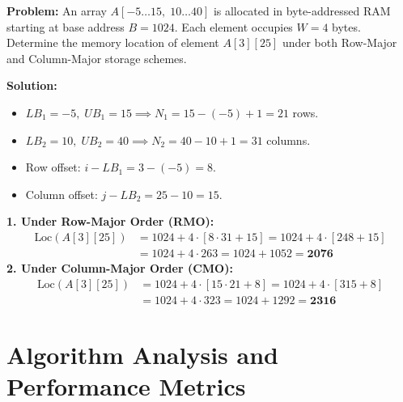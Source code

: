 \documentclass[12pt,a4paper]{article}
\begin{document}
\begin{tcolorbox}[examplebox, title={\textbf{Exam Numerical: 2D Array Address Calculation}}]
\textbf{Problem:} An array $A[-5 \dots 15, \; 10 \dots 40]$ is allocated in byte-addressed RAM starting at base address $B = 1024$. Each element occupies $W = 4$ bytes. Determine the memory location of element $A[3][25]$ under both Row-Major and Column-Major storage schemes.
\par\vspace{4pt}
\textbf{Solution:}
\begin{itemize}[leftmargin=*, itemsep=2pt]
  \item $LB_1 = -5, \; UB_1 = 15 \implies N_1 = 15 - (-5) + 1 = 21$ rows.
  \item $LB_2 = 10, \; UB_2 = 40 \implies N_2 = 40 - 10 + 1 = 31$ columns.
  \item Row offset: $i - LB_1 = 3 - (-5) = 8$.
  \item Column offset: $j - LB_2 = 25 - 10 = 15$.
\end{itemize}
\textbf{1. Under Row-Major Order (RMO):}
\begin{align*}
  \text{Loc}(A[3][25]) &= 1024 + 4 \cdot [8 \cdot 31 + 15] = 1024 + 4 \cdot [248 + 15] \\
  &= 1024 + 4 \cdot 263 = 1024 + 1052 = \mathbf{2076}
\end{align*}
\textbf{2. Under Column-Major Order (CMO):}
\begin{align*}
  \text{Loc}(A[3][25]) &= 1024 + 4 \cdot [15 \cdot 21 + 8] = 1024 + 4 \cdot [315 + 8] \\
  &= 1024 + 4 \cdot 323 = 1024 + 1292 = \mathbf{2316}
\end{align*}
\end{tcolorbox}

\section{Algorithm Analysis and Performance Metrics}
\end{document}
